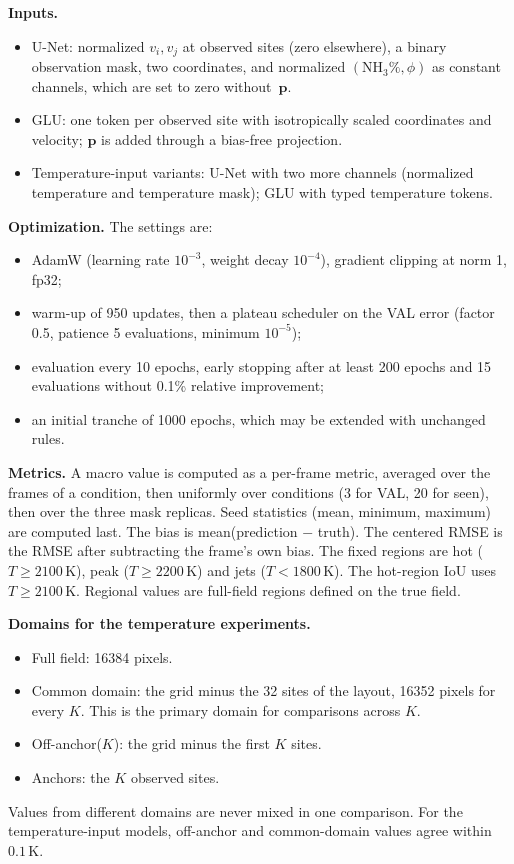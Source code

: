 \documentclass[11pt,letterpaper]{article}
\newcommand{\K}{\,\mathrm{K}}
\newcommand{\poff}{without~$\mathbf{p}$}
\newcommand{\NH}{\text{NH}_3}
\begin{document}
\textbf{Inputs.}
\begin{itemize}
  \item U-Net: normalized $v_i,v_j$ at observed sites (zero elsewhere), a binary observation mask, two coordinates, and normalized $(\NH\%,\phi)$ as constant channels, which are set to zero \poff.
  \item GLU: one token per observed site with isotropically scaled coordinates and velocity; $\mathbf{p}$ is added through a bias-free projection.
  \item Temperature-input variants: U-Net with two more channels (normalized temperature and temperature mask); GLU with typed temperature tokens.
\end{itemize}

\textbf{Optimization.} The settings are:
\begin{itemize}
  \item AdamW (learning rate $10^{-3}$, weight decay $10^{-4}$), gradient clipping at norm 1, fp32;
  \item warm-up of 950 updates, then a plateau scheduler on the VAL error (factor 0.5, patience 5 evaluations, minimum $10^{-5}$);
  \item evaluation every 10 epochs, early stopping after at least 200 epochs and 15 evaluations without 0.1\% relative improvement;
  \item an initial tranche of 1000 epochs, which may be extended with unchanged rules.
\end{itemize}

\textbf{Metrics.} A macro value is computed as a per-frame metric, averaged over the frames of a condition, then uniformly over conditions (3 for VAL, 20 for seen), then over the three mask replicas. Seed statistics (mean, minimum, maximum) are computed last. The bias is mean(prediction $-$ truth). The centered RMSE is the RMSE after subtracting the frame's own bias. The fixed regions are hot ($T\ge2100\K$), peak ($T\ge2200\K$) and jets ($T<1800\K$). The hot-region IoU uses $T\ge2100\K$. Regional values are full-field regions defined on the true field.

\textbf{Domains for the temperature experiments.}
\begin{itemize}
  \item Full field: 16384 pixels.
  \item Common domain: the grid minus the 32 sites of the layout, 16352 pixels for every $K$. This is the primary domain for comparisons across $K$.
  \item Off-anchor($K$): the grid minus the first $K$ sites.
  \item Anchors: the $K$ observed sites.
\end{itemize}
Values from different domains are never mixed in one comparison. For the temperature-input models, off-anchor and common-domain values agree within $0.1\K$.
\end{document}
